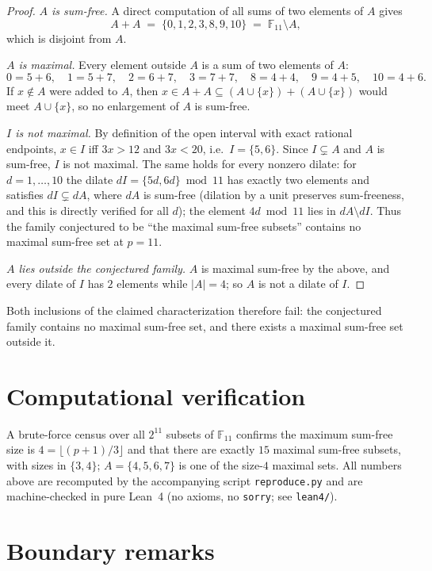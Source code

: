 \documentclass[11pt]{article}
\newcommand{\F}{\mathbb{F}}
\begin{document}
\begin{proof}
\emph{$A$ is sum-free.} A direct computation of all sums of two elements of
$A$ gives
\[
A + A \;=\; \{0,1,2,3,8,9,10\} \;=\; \F_{11} \setminus A,
\]
which is disjoint from $A$.

\emph{$A$ is maximal.} Every element outside $A$ is a sum of two elements of
$A$:
\[
0 = 5+6,\quad 1 = 5+7,\quad 2 = 6+7,\quad 3 = 7+7,\quad
8 = 4+4,\quad 9 = 4+5,\quad 10 = 4+6 .
\]
If $x \notin A$ were added to $A$, then $x \in A + A \subseteq
(A \cup \{x\}) + (A \cup \{x\})$ would meet $A \cup \{x\}$, so no enlargement
of $A$ is sum-free.

\emph{$I$ is not maximal.} By definition of the open interval with exact
rational endpoints, $x \in I$ iff $3x > 12$ and $3x < 20$, i.e.\
$I = \{5,6\}$. Since $I \subsetneq A$ and $A$ is sum-free, $I$ is not maximal.
The same holds for every nonzero dilate: for $d = 1,\dots,10$ the dilate
$dI = \{5d, 6d\} \bmod 11$ has exactly two elements and satisfies
$dI \subsetneq dA$, where $dA$ is sum-free (dilation by a unit preserves
sum-freeness, and this is directly verified for all $d$); the element
$4d \bmod 11$ lies in $dA \setminus dI$. Thus the family conjectured to be
``the maximal sum-free subsets'' contains no maximal sum-free set at
$p = 11$.

\emph{$A$ lies outside the conjectured family.} $A$ is maximal sum-free by
the above, and every dilate of $I$ has $2$ elements while $|A| = 4$; so $A$
is not a dilate of $I$.
\end{proof}

Both inclusions of the claimed characterization therefore fail: the
conjectured family contains no maximal sum-free set, and there exists a
maximal sum-free set outside it.

\section{Computational verification}

A brute-force census over all $2^{11}$ subsets of $\F_{11}$ confirms the
maximum sum-free size is $4 = \lfloor (p+1)/3 \rfloor$ and that there are
exactly $15$ maximal sum-free subsets, with sizes in $\{3,4\}$;
$A = \{4,5,6,7\}$ is one of the size-$4$ maximal sets. All numbers above are
recomputed by the accompanying script \texttt{reproduce.py} and are
machine-checked in pure Lean~4 (no axioms, no \texttt{sorry}; see
\texttt{lean4/}).

\section{Boundary remarks}
\end{document}
